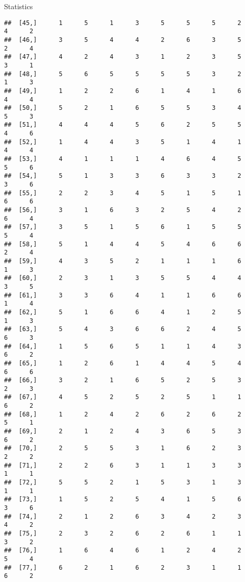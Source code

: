 \documentclass[
  ignorenonframetext,
]{beamer}
\begin{document}
\begin{frame}[fragile]{Statistics}
\begin{verbatim}
##  [45,]      1      5      1      3      5      5      5      2      4      2
##  [46,]      3      5      4      4      2      6      3      5      2      4
##  [47,]      4      2      4      3      1      2      3      5      3      1
##  [48,]      5      6      5      5      5      5      3      2      1      3
##  [49,]      1      2      2      6      1      4      1      6      4      4
##  [50,]      5      2      1      6      5      5      3      4      5      3
##  [51,]      4      4      4      5      6      2      5      5      4      6
##  [52,]      1      4      4      3      5      1      4      1      4      4
##  [53,]      4      1      1      1      4      6      4      5      5      6
##  [54,]      5      1      3      3      6      3      3      2      3      6
##  [55,]      2      2      3      4      5      1      5      1      6      6
##  [56,]      3      1      6      3      2      5      4      2      6      4
##  [57,]      3      5      1      5      6      1      5      5      5      4
##  [58,]      5      1      4      4      5      4      6      6      2      4
##  [59,]      4      3      5      2      1      1      1      6      1      3
##  [60,]      2      3      1      3      5      5      4      4      3      5
##  [61,]      3      3      6      4      1      1      6      6      1      4
##  [62,]      5      1      6      6      4      1      2      5      1      3
##  [63,]      5      4      3      6      6      2      4      5      6      3
##  [64,]      1      5      6      5      1      1      4      3      6      2
##  [65,]      1      2      6      1      4      4      5      4      6      6
##  [66,]      3      2      1      6      5      2      5      3      2      3
##  [67,]      4      5      2      5      2      5      1      1      6      2
##  [68,]      1      2      4      2      6      2      6      2      5      1
##  [69,]      2      1      2      4      3      6      5      3      6      2
##  [70,]      2      5      5      3      1      6      2      3      2      2
##  [71,]      2      2      6      3      1      1      3      3      1      1
##  [72,]      5      5      2      1      5      3      1      3      1      1
##  [73,]      1      5      2      5      4      1      5      6      3      6
##  [74,]      2      1      2      6      3      4      2      3      4      2
##  [75,]      2      3      2      6      2      6      1      1      3      2
##  [76,]      1      6      4      6      1      2      4      2      5      4
##  [77,]      6      2      1      6      2      3      1      1      6      2

\end{verbatim}
\end{frame}
\end{document}
